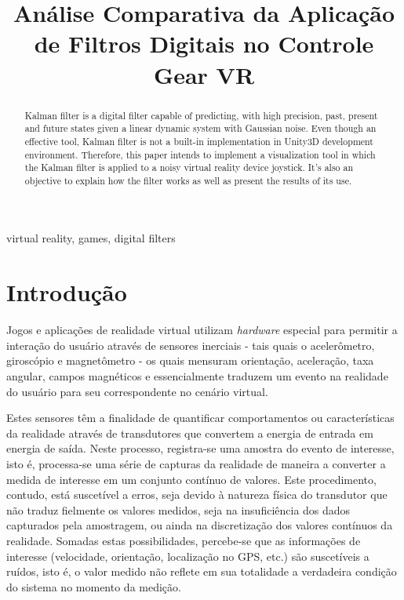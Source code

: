 \documentclass[conference]{IEEEtran}
\begin{document}
\title{Análise Comparativa da Aplicação de Filtros Digitais no Controle Gear VR}

\author{
}

\maketitle

\begin{abstract}
Kalman filter is a digital filter capable of predicting, with high precision, past, present and future states given a linear dynamic system with Gaussian noise. Even though an effective tool, Kalman filter is not a built-in implementation in Unity3D development environment. Therefore, this paper intends to implement  a visualization tool in which the Kalman filter is applied to a noisy virtual reality device joystick. It's also an objective to explain how the filter works as well as present the results of its use.
\end{abstract}

\begin{IEEEkeywords}
virtual reality, games, digital filters
\end{IEEEkeywords}

\section{Introdução}
Jogos e aplicações de realidade virtual utilizam \textit{hardware} especial para permitir a interação do usuário através de sensores inerciais - tais quais o acelerômetro, giroscópio e magnetômetro - os quais mensuram orientação, aceleração, taxa angular, campos magnéticos e essencialmente traduzem um evento na realidade do usuário para seu correspondente no cenário virtual.

Estes sensores têm a finalidade de quantificar comportamentos ou características da realidade através de transdutores que convertem a energia de entrada em energia de saída. Neste processo, registra-se uma amostra do evento de interesse, isto é, processa-se uma série de capturas da realidade de maneira a converter a medida de interesse em um conjunto contínuo de valores. Este procedimento, contudo, está suscetível a erros, seja devido à natureza física do transdutor que não traduz fielmente os valores medidos, seja na insuficiência dos dados capturados pela amostragem, ou ainda na discretização dos valores contínuos da realidade. Somadas estas possibilidades, percebe-se que as informações de interesse (velocidade, orientação, localização no GPS, etc.) são suscetíveis a ruídos, isto é, o valor medido não reflete em sua totalidade a verdadeira condição do sistema no momento da medição.
\end{document}

